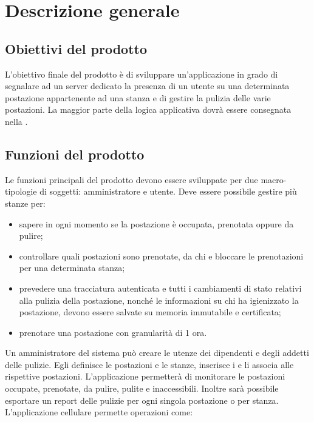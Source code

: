 \section{Descrizione generale}

\subsection{Obiettivi del prodotto}
L'obiettivo finale del prodotto è di sviluppare un’applicazione in grado di segnalare ad un server dedicato la presenza di un utente su una determinata postazione appartenente ad una stanza e di gestire la pulizia delle varie postazioni.
La maggior parte della logica applicativa dovrà essere consegnata nella  .

\subsection{Funzioni del prodotto}
Le funzioni principali del prodotto devono essere sviluppate per due macro-tipologie di soggetti: amministratore e utente.
Deve essere possibile gestire più stanze per:
\begin{itemize}
	\item sapere in ogni momento se la postazione è occupata, prenotata oppure da pulire; \\
	\item controllare quali postazioni sono prenotate, da chi e bloccare le prenotazioni per una determinata stanza; \\
	\item prevedere una tracciatura autenticata e tutti i cambiamenti di stato relativi alla pulizia della postazione, nonché le informazioni su chi ha igienizzato la postazione, devono essere salvate su memoria immutabile e certificata; \\
	\item prenotare una postazione con granularità di 1 ora. \\
\end{itemize}
Un amministratore del sistema può creare le utenze dei dipendenti e degli addetti delle pulizie. Egli definisce le postazioni e le stanze, inserisce i  e li associa alle rispettive postazioni.
L'applicazione permetterà di monitorare le postazioni occupate, prenotate, da pulire, pulite e inaccessibili. Inoltre sarà possibile esportare un report delle pulizie per ogni singola postazione o per stanza.
L’applicazione cellulare permette operazioni come:
